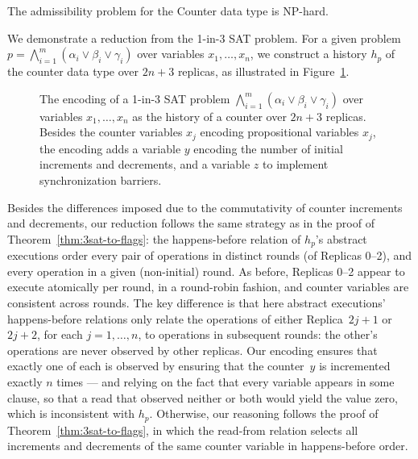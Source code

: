 \vspace{-1mm}
\begin{theorem}
  \label{thm:3sat-to-counter}

  The admissibility problem for the Counter data type is NP-hard.

\vspace{-1mm}
\end{theorem}

We demonstrate a reduction from the 1-in-3 SAT problem. For a given problem $p = \bigwedge_{i=1}^{m} (\alpha_i \lor \beta_i \lor \gamma_i)$ over variables $x_1, \ldots, x_n$, we construct a history $h_p$ of the counter data type over $2n+3$ replicas, as illustrated in Figure~\ref{fig:3sat-to-counter}.

    \begin{figure}[t]
      \centering
      {\scriptsize}
     \vspace{-1mm}
      \caption{The encoding of a 1-in-3 SAT problem $\bigwedge_{i=1}^{m} (\alpha_i \lor \beta_i \lor \gamma_i)$ over variables $x_1, \ldots, x_n$ as the history of a counter over $2n+3$ replicas. Besides the counter variables $x_j$ encoding propositional variables $x_j$, the encoding adds a variable $y$ encoding the number of initial increments and decrements, and a variable $z$ to implement synchronization barriers.}
      \label{fig:3sat-to-counter}
     \vspace{-4mm}
    \end{figure}

     Besides the differences imposed due to the commutativity of counter increments and decrements, our reduction follows the same strategy as in the proof of Theorem~\ref{thm:3sat-to-flags}: the happens-before relation of $h_p$’s abstract executions order every pair of operations in distinct rounds (of Replicas 0–2), and every operation in a given (non-initial) round. As before, Replicas 0–2 appear to execute atomically per round, in a round-robin fashion, and counter variables are consistent across rounds. The key difference is that here abstract executions’ happens-before relations only relate the operations of either Replica~$2j\!+\!1$ or $2j\!+\!2$, for each $j = 1, \ldots, n$, to operations in subsequent rounds: the other’s operations are never observed by other replicas. Our encoding ensures that exactly one of each is observed by ensuring that the counter~$y$ is incremented exactly $n$ times — and relying on the fact that every variable appears in some clause, so that a read that observed neither or both would yield the value zero, which is inconsistent with $h_p$. Otherwise, our reasoning follows the proof of Theorem~\ref{thm:3sat-to-flags}, in which the read-from relation selects all increments and decrements of the same counter variable in happens-before order.
\vspace{-2mm}

